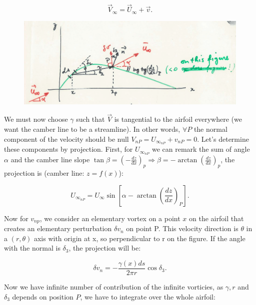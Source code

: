 	\begin{equation}
	\vec{V}_\infty = \vec{U}_\infty + \vec{v}.
	\end{equation}
	
	\begin{figure}
	\vspace{-5mm}
	\includegraphics[scale=0.1]{ch2/33}
	\end{figure}
	We must now choose $\gamma$ such that $\vec{V}$ is tangential to the airfoil everywhere (we want the camber line to be a streamline). In other words, $\forall P$ the normal component of the velocity should be null $V_{nP} = U_{\infty _{nP}} + v_{nP} = 0$. Let's determine these components by projection. First, for $U_{\infty _{nP}}$ we can remark the sum of angle $\alpha$ and the camber line slope $\tan \beta =  \left(-\frac{dz}{dx}\right)_p \Rightarrow \beta = -\arctan \left(\frac{dz}{dx}\right)_p$, the projection is (camber line: $z = f(x)$):
	
	\begin{equation}
	U_{\infty _{nP}} = U_\infty \sin \left[ \alpha - \arctan \left(\frac{dz}{dx} \right)_P \right].
	\label{eq:2.54}
\end{equation}	 

	Now for $v_{np}$, we consider an elementary vortex on a point $x$ on the airfoil that creates an elementary perturbation $\delta v_n$ on point P. This velocity direction is $\theta$ in a $(r,\theta)$ axis with origin at x, so perpendicular to r on the figure. If the angle with the normal is $\delta _3$, the projection will be:
	
	\begin{equation}
	\delta v_n = -\frac{\gamma (x) ds}{2\pi r} \cos \delta _3 .
	\end{equation}
	
	Now we have infinite number of contribution of the infinite vorticies, as $\gamma , r$ and $\delta _3$ depends on position $P$, we have to integrate over the whole airfoil:
	

